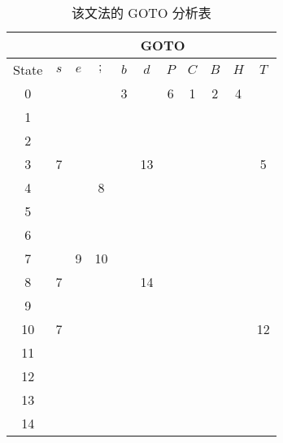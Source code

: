 \documentclass[UTF8]{ctexart}
\begin{document}
    \begin{table}[htbp!]
        \centering
        \begin{tabular}{|c|c|c|c|c|c|c|c|c|c|c|}
            \hline
            & \multicolumn{10}{|c|}{GOTO}  \\
            \hline
            State &  $s$  &  $e$  &  $;$  &  $b$  &  $d$  &  $P$  &  $C$  &  $B$  &  $H$  &  $T$  \\
            \hline
            0     &       &       &       &   3   &       &   6   &  1    &   2   &   4   &       \\
            \hline
            1     &       &       &       &       &       &       &       &       &       &       \\
            \hline
            2     &       &       &       &       &       &       &       &       &       &       \\
            \hline
            3     &   7   &       &       &       &  13   &       &       &       &       &   5   \\
            \hline
            4     &       &       &   8   &       &       &       &       &       &       &       \\
            \hline
            5     &       &       &       &       &       &       &       &       &       &       \\
            \hline
            6     &       &       &       &       &       &       &       &       &       &       \\
            \hline
            7     &       &   9   &   10  &       &       &       &       &       &       &       \\
            \hline
            8     &   7   &       &       &       &  14   &       &       &       &       &       \\
            \hline
            9     &       &       &       &       &       &       &       &       &       &       \\
            \hline
            10    &   7   &       &       &       &       &       &       &       &       &   12  \\
            \hline
            11    &       &       &       &       &       &       &       &       &       &       \\
            \hline
            12    &       &       &       &       &       &       &       &       &       &       \\
            \hline
            13    &       &       &       &       &       &       &       &       &       &       \\
            \hline
            14    &       &       &       &       &       &       &       &       &       &       \\
            \hline
            
        \end{tabular}
        \caption{该文法的 GOTO 分析表}
        \label{slr1goto}
    \end{table}
\end{document}
